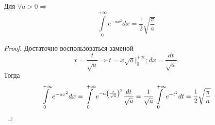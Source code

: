\begin{consequence}
	Для $\forall a > 0 \Rightarrow$
	\begin{equation}
		\label{eq:lecture7-30}
		\boxed{\int\limits_0^{+\infty}e^{-ax^2}dx =
		\dfrac{1}{2}\sqrt{\dfrac{\pi}{a}}}
	\end{equation}
\end{consequence}
\begin{proof}
	Достаточно воспользоваться заменой
	\begin{equation*}
		x = \dfrac{t}{\sqrt{a}} \Rightarrow t = x \sqrt{a}\vert_0^{+\infty};
		dx = \dfrac{dt}{\sqrt{a}}.
	\end{equation*}
	Тогда
	\begin{equation*}
		\int\limits_0^{+\infty}e^{-ax^2}dx = \int\limits_0^{+\infty}e^{-a\left( \frac{t}{\sqrt{a}} \right)^2}
		\dfrac{dt}{\sqrt{a}} = \dfrac{1}{\sqrt{a}}\int\limits_0^{+\infty}e^{-t^2}dt
		= \dfrac{1}{2}\sqrt{\dfrac{\pi}{a}}
	\end{equation*}
\end{proof}
